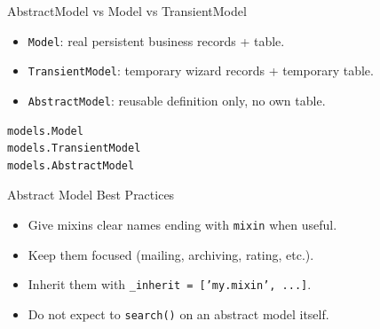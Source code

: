 \begin{frame}[fragile]{AbstractModel vs Model vs TransientModel}
	\begin{itemize}
		\item \texttt{Model}: real persistent business records + table.
		\item \texttt{TransientModel}: temporary wizard records + temporary table.
		\item \texttt{AbstractModel}: reusable definition only, no own table.
	\end{itemize}
\begin{lstlisting}
models.Model
models.TransientModel
models.AbstractModel
\end{lstlisting}
\end{frame}

\begin{frame}[fragile]{Abstract Model Best Practices}
	\begin{itemize}
		\item Give mixins clear names ending with \texttt{mixin} when useful.
		\item Keep them focused (mailing, archiving, rating, etc.).
		\item Inherit them with \texttt{\_inherit = ['my.mixin', ...]}.
		\item Do not expect to \texttt{search()} on an abstract model itself.
	\end{itemize}
\end{frame}
